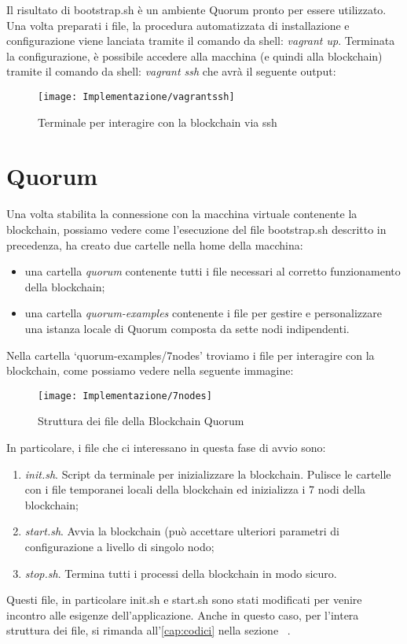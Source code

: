 Il risultato di bootstrap.sh è un ambiente Quorum pronto per essere utilizzato. Una volta preparati i file, la procedura automatizzata di installazione e configurazione viene lanciata tramite il comando da shell: \emph{vagrant up}. Terminata la configurazione, è possibile accedere alla macchina (e quindi alla blockchain) tramite il comando da shell: \emph{vagrant ssh} che avrà il seguente output:
%
\begin{figure}[H]
	\centering
	\texttt{[image: Implementazione/vagrantssh]}
	\caption{Terminale per interagire con la blockchain via ssh}
	\label{fig:terminale per interagire con la blockchain}
\end{figure}
%
\section{Quorum}
%
Una volta stabilita la connessione con la macchina virtuale contenente la blockchain, possiamo vedere come l'esecuzione del file bootstrap.sh descritto in precedenza, ha creato due cartelle nella home della macchina:
\begin{itemize}
	\item una cartella \emph{quorum} contenente tutti i file necessari al corretto funzionamento della blockchain;
	\item una cartella \emph{quorum-examples} contenente i file per gestire e personalizzare una istanza locale di Quorum composta da sette nodi indipendenti.
\end{itemize}
Nella cartella \enquote*{quorum-examples/7nodes} troviamo i file per interagire con la blockchain, come possiamo vedere nella seguente immagine:
%
\begin{figure}[H]
	\centering
	\texttt{[image: Implementazione/7nodes]}
	\caption{Struttura dei file della Blockchain Quorum}
	\label{fig:file blockchain quorum}
\end{figure}
%
In particolare, i file che ci interessano in questa fase di avvio sono:
\begin{enumerate}
	\item \emph{init.sh}. Script da terminale per inizializzare la blockchain. Pulisce le cartelle con i file temporanei locali della blockchain ed inizializza i 7 nodi della blockchain;
	\item \emph{start.sh}. Avvia la blockchain (può accettare ulteriori parametri di configurazione a livello di singolo nodo;
	\item \emph{stop.sh}. Termina tutti i processi della blockchain in modo sicuro.
\end{enumerate}
Questi file, in particolare init.sh e start.sh sono stati modificati per venire incontro alle esigenze dell'applicazione. Anche in questo caso, per l'intera struttura dei file, si rimanda all'\autoref{cap:codici} nella sezione ~.
